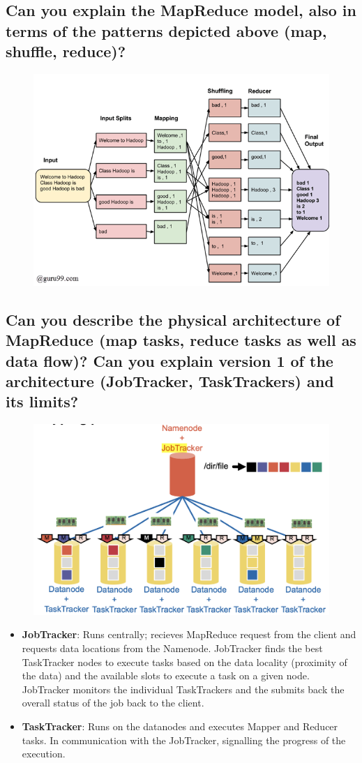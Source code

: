 \documentclass{article}
\begin{document}
\subsection{Can you explain the MapReduce model, also in terms of the patterns depicted above (map, shuffle, reduce)?}

\begin{figure}[H]
    \centering
    \includegraphics[width=0.5\linewidth]{img/map_reduce_ex.png}
\end{figure}


\subsection{Can you describe the physical architecture of MapReduce (map tasks, reduce tasks as well as data flow)? Can you explain version 1 of the architecture (JobTracker, TaskTrackers) and its limits?}

\begin{figure}
    \centering
    \includegraphics[width=0.5\linewidth]{img/mapred_v1.png}
\end{figure}

\begin{itemize}
    \item \textbf{JobTracker}: Runs centrally; recieves MapReduce request from the client and requests data locations from the Namenode. JobTracker finds the best TaskTracker nodes to execute tasks based on the data locality (proximity of the data) and the available slots to execute a task on a given node. JobTracker monitors the individual TaskTrackers and the submits back the overall status of the job back to the client.
    \item \textbf{TaskTracker}: Runs on the datanodes and executes Mapper and Reducer tasks. In communication with the JobTracker, signalling the progress of the execution. 
\end{itemize}
\end{document}
